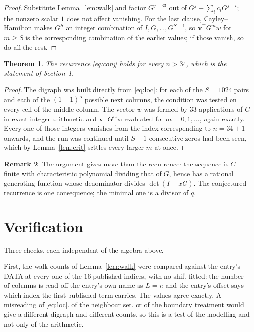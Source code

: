 \documentclass[11pt,a4paper]{article}
\theoremstyle{plain}
\newtheorem{theorem}{Theorem}
\theoremstyle{definition}
\newtheorem{remark}[theorem]{Remark}
\begin{document}
\begin{proof}
Substitute Lemma~\ref{lem:walk} and factor $G^{j-33}$ out of
$G^{j}-\sum_ic_iG^{j-i}$; the nonzero scalar $1$ does not affect
vanishing. For the last clause, Cayley--Hamilton makes $G^{S}$ an integer combination of
$I,G,\dots,G^{S-1}$, so $\mathbf{v}^{\!\top}G^{m}w$ for $m\ge S$ is the corresponding
combination of the earlier values; if those vanish, so do all the rest.
\end{proof}

\begin{theorem}
The recurrence \eqref{eq:conj} holds for every $n>34$, which is the statement of
Section~1.
\end{theorem}

\begin{proof}
The digraph was built directly from \eqref{eq:loc}: for each of the $S=1024$ pairs and each
of the $(1+1)^{5}$ possible next columns, the condition was tested on every cell of
the middle column. The vector $w$ was formed by $33$ applications of $G$ in exact integer
arithmetic and $\mathbf{v}^{\!\top}G^{m}w$ evaluated for $m=0,1,\dots$, again exactly.
Every one of those integers vanishes from the index corresponding to $n=34+1$ onwards,
and the run was continued until $S+1$ consecutive zeros had been seen, which by
Lemma~\ref{lem:crit} settles every larger $m$ at once.
\end{proof}

\begin{remark}
The argument gives more than the recurrence: the sequence is $C$-finite with characteristic
polynomial dividing that of $G$, hence has a rational generating function whose denominator
divides $\det(I-xG)$. The conjectured recurrence is one consequence; the minimal one is a
divisor of $q$.
\end{remark}

\section{Verification}

Three checks, each independent of the algebra above.

First, the walk counts of Lemma~\ref{lem:walk} were compared against the entry's DATA at
every one of the $16$ published indices, with no shift fitted: the number of columns is
read off the entry's own name as $L=n$ and the entry's offset says which index the first
published term carries. The values agree exactly. A misreading of \eqref{eq:loc}, of the
neighbour set, or of the boundary treatment would give a different digraph and different
counts, so this is a test of the modelling and not only of the arithmetic.
\end{document}
